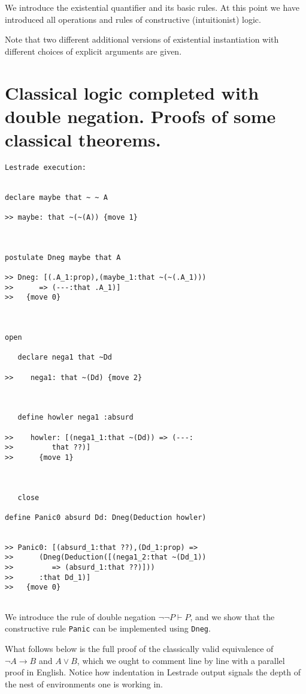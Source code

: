 \documentclass[12pt]{article}
\begin{document}
We introduce the existential quantifier and its basic rules.  At this point we have introduced all operations and rules of constructive (intuitionist) logic.

Note that two different additional versions of existential instantiation with different choices of explicit arguments are given.

\section{Classical logic completed with double negation.  Proofs of some classical theorems.}

\begin{verbatim}Lestrade execution:


declare maybe that ~ ~ A

>> maybe: that ~(~(A)) {move 1}



postulate Dneg maybe that A

>> Dneg: [(.A_1:prop),(maybe_1:that ~(~(.A_1)))
>>      => (---:that .A_1)]
>>   {move 0}



open

   declare nega1 that ~Dd

>>    nega1: that ~(Dd) {move 2}



   define howler nega1 :absurd

>>    howler: [(nega1_1:that ~(Dd)) => (---:
>>         that ??)]
>>      {move 1}



   close

define Panic0 absurd Dd: Dneg(Deduction howler)


>> Panic0: [(absurd_1:that ??),(Dd_1:prop) =>
>>      (Dneg(Deduction([(nega1_2:that ~(Dd_1))
>>         => (absurd_1:that ??)]))
>>      :that Dd_1)]
>>   {move 0}


\end{verbatim}

We introduce the rule of double negation $\neg \neg P \vdash P$, and we show that the constructive rule {\tt Panic} can be implemented using
{\tt Dneg}.

What follows below is the full proof of the classically valid equivalence of $\neg A \rightarrow B$ and $A \vee B$, which we ought to comment
line by line with a parallel proof in English.  Notice how indentation in Lestrade output signals the depth of the nest of environments one is working in.
\end{document}
